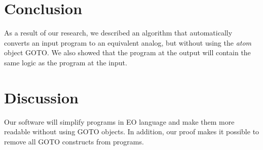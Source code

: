 \documentclass[sigplan,review,11pt,nonacm,natbib=false]{acmart}
\begin{document}
\section{Conclusion}
As a result of our research, we described an algorithm that automatically converts an input program to an equivalent analog, but without using the \emph{atom} object GOTO. We also showed that the program at the output will contain the same logic as the program at the input.

\section{Discussion}
Our software will simplify programs in EO language and make them more readable without using GOTO objects. In addition, our proof makes it possible to remove all GOTO constructs from programs.
\end{document}
